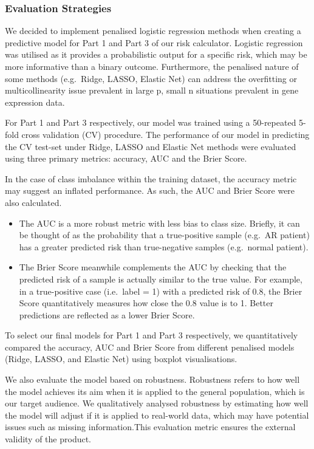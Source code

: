 \documentclass[a4paper,9pt,twocolumn,twoside,]{pinp}
\begin{document}
\hypertarget{evaluation-strategies}{%
\subsubsection{Evaluation Strategies}\label{evaluation-strategies}}

We decided to implement penalised logistic regression methods when
creating a predictive model for Part 1 and Part 3 of our risk
calculator. Logistic regression was utilised as it provides a
probabilistic output for a specific risk, which may be more informative
than a binary outcome. Furthermore, the penalised nature of some methods
(e.g.~Ridge, LASSO, Elastic Net) can address the overfitting or
multicollinearity issue prevalent in large p, small n situations
prevalent in gene expression data.

For Part 1 and Part 3 respectively, our model was trained using a
50-repeated 5-fold cross validation (CV) procedure. The performance of
our model in predicting the CV test-set under Ridge, LASSO and Elastic
Net methods were evaluated using three primary metrics: accuracy, AUC
and the Brier Score.

In the case of class imbalance within the training dataset, the accuracy
metric may suggest an inflated performance. As such, the AUC and Brier
Score were also calculated.

\begin{itemize}
\item
  The AUC is a more robust metric with less bias to class size. Briefly,
  it can be thought of as the probability that a true-positive sample
  (e.g.~AR patient) has a greater predicted risk than true-negative
  samples (e.g.~normal patient).
\item
  The Brier Score meanwhile complements the AUC by checking that the
  predicted risk of a sample is actually similar to the true value. For
  example, in a true-positive case (i.e.~label = 1) with a predicted
  risk of 0.8, the Brier Score quantitatively measures how close the 0.8
  value is to 1. Better predictions are reflected as a lower Brier
  Score.
\end{itemize}

To select our final models for Part 1 and Part 3 respectively, we
quantitatively compared the accuracy, AUC and Brier Score from different
penalised models (Ridge, LASSO, and Elastic Net) using boxplot
visualisations.

We also evaluate the model based on robustness. Robustness refers to how
well the model achieves its aim when it is applied to the general
population, which is our target audience. We qualitatively analysed
robustness by estimating how well the model will adjust if it is applied
to real-world data, which may have potential issues such as missing
information.This evaluation metric ensures the external validity of the
product.
\end{document}
